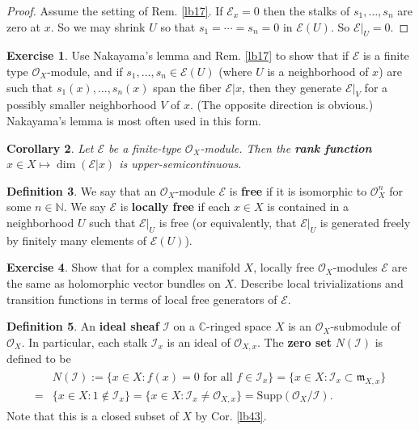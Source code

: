 \documentclass[12pt,b5paper,notitlepage]{report}
\theoremstyle{definition}
\newtheorem{df}{Definition}[section]
\newtheorem{exe}[df]{Exercise}
\theoremstyle{plain}
\newtheorem{co}[df]{Corollary}
\newcommand{\fk}{\mathfrak}
\newcommand{\mc}{\mathcal}
\newcommand{\scr}{\mathscr}
\newcommand{\Cbb}{\mathbb C}
\newcommand{\Nbb}{\mathbb N}
\newcommand{\Supp}{\mathrm{Supp}}
\numberwithin{equation}{section}
\begin{document}
\begin{proof}
Assume the setting of Rem. \ref{lb17}. If $\scr E_x=0$ then the stalks of $s_1,\dots,s_n$ are zero at $x$. So we may shrink $U$ so that $s_1=\cdots=s_n=0$ in $\scr E(U)$. So $\scr E|_U=0$.
\end{proof}






\begin{exe}\label{lb64}
Use Nakayama's lemma and Rem. \ref{lb17} to show that if $\scr E$ is a finite type $\scr O_X$-module, and if $s_1,\dots,s_n\in\scr E(U)$ (where $U$ is a neighborhood of $x$) are such that $s_1(x),\dots,s_n(x)$ span the fiber $\scr E|x$, then they generate $\scr E|_V$ for a possibly smaller neighborhood $V$ of $x$. (The opposite direction is obvious.) Nakayama's lemma is most often used in this form.
\end{exe}


\begin{co}\label{lb351}
Let $\scr E$ be a finite-type $\scr O_X$-module. Then the \textbf{rank function}  $x\in X\mapsto \dim(\scr E|x)$ is upper-semicontinuous.
\end{co}


\begin{df}
We say that an $\scr O_X$-module $\scr E$ is \textbf{free} if it is isomorphic to $\scr O_X^n$ for some $n\in\Nbb$. We say $\scr E$ is \textbf{locally free} if each $x\in X$ is contained in a neighborhood $U$ such that $\scr E|_U$ is free (or equivalently, that $\scr E|_U$ is generated freely by finitely many elements of $\scr E(U)$).
\end{df}

\begin{exe}
Show that for a complex manifold $X$, locally free $\scr O_X$-modules $\scr E$ are the same as holomorphic vector bundles on $X$. Describe local trivializations and transition functions in terms of local free generators of $\scr E$. %
\end{exe}


\begin{df}
An \textbf{ideal sheaf}  $\mc I$ on a $\Cbb$-ringed space $X$ is an $\scr O_X$-submodule of $\scr O_X$. In particular, each stalk $\mc I_x$ is an ideal of $\scr O_{X,x}$. The \textbf{zero set} $N(\mc I)$ \index{00@Zero sets $N(\mc I)$} is defined to be
\begin{align}
\begin{aligned}\label{eq3}
&N(\mc I):=\{x\in X:f(x)=0\text{ for all }f\in\mc I_x\}=\{x\in X:\mc I_x\subset\fk m_{X,x}\}\\
=&\{x\in X:1\notin\mc I_x\}=\{x\in X:\mc I_x\neq\scr O_{X,x}\}=\Supp(\scr O_X/\mc I).
\end{aligned}
\end{align}
Note that this is a closed subset of $X$ by Cor. \ref{lb43}.
\end{df}
\end{document}
